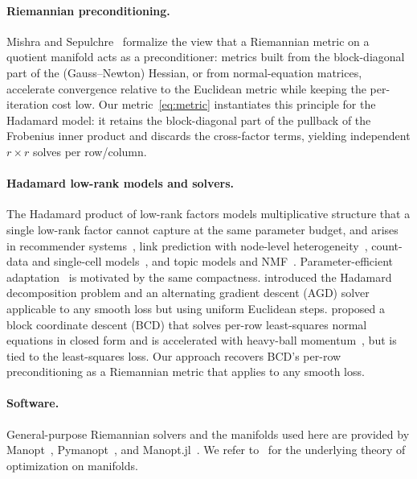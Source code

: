 \documentclass[letterpaper, 10 pt, conference]{ieeeconf}
\theoremstyle{plain}
\theoremstyle{definition}
\theoremstyle{remark}
\begin{document}
\paragraph{Riemannian preconditioning.}
Mishra and Sepulchre~\cite{mishra2016riemannian} formalize the view that a Riemannian metric on a quotient manifold acts as a preconditioner: metrics built from the block-diagonal part of the (Gauss--Newton) Hessian, or from normal-equation matrices, accelerate convergence relative to the Euclidean metric while keeping the per-iteration cost low. Our metric~\eqref{eq:metric} instantiates this principle for the Hadamard model: it retains the block-diagonal part of the pullback of the Frobenius inner product and discards the cross-factor terms, yielding independent $r\times r$ solves per row/column.

\paragraph{Hadamard low-rank models and solvers.}
The Hadamard product of low-rank factors models multiplicative structure that a single low-rank factor cannot capture at the same parameter budget, and arises in recommender systems~\cite{koren2009matrix}, link prediction with node-level heterogeneity~\cite{hoff2002latent}, count-data and single-cell models~\cite{townes2019glmpca}, and topic models and NMF~\cite{lee1999nmf}. Parameter-efficient adaptation~\cite{hu2022lora} is motivated by the same compactness. \citet{ciaperoni2024hadamard} introduced the Hadamard decomposition problem and an alternating gradient descent (AGD) solver applicable to any smooth loss but using uniform Euclidean steps. \citet{wertz2024bcd} proposed a block coordinate descent (BCD) that solves per-row least-squares normal equations in closed form and is accelerated with heavy-ball momentum~\cite{polyak1964heavy}, but is tied to the least-squares loss. Our approach recovers BCD's per-row preconditioning as a Riemannian metric that applies to any smooth loss.

\paragraph{Software.}
General-purpose Riemannian solvers and the manifolds used here are provided by Manopt~\cite{manopt}, Pymanopt~\cite{pymanopt}, and Manopt.jl~\cite{manoptjl}. We refer to~\cite{absilbook,boumal2023introduction} for the underlying theory of optimization on manifolds.

\end{document}
